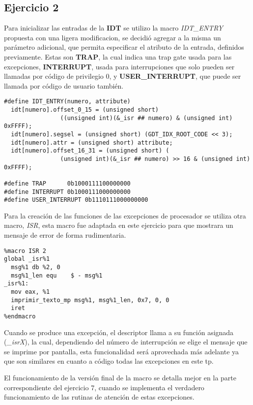 \subsection{Ejercicio 2}

Para inicializar las entradas de la {\bf IDT} se utilizo la macro {\it IDT_ENTRY\/}
propuesta con una ligera modificacion, se decidió agregar a la misma un
parámetro adicional, que permita especificar el atributo de la entrada,
definidos previamente.
Estas son {\bf TRAP}, la cual indica una trap gate usada para
las excepciones, {\bf INTERRUPT}, usada para interrupciones que solo pueden ser
llamadas por código de privilegio 0, y {\bf USER_INTERRUPT}, que puede ser llamada
por código de usuario también.

\begin{lstlisting}
#define IDT_ENTRY(numero, attribute)
  idt[numero].offset_0_15 = (unsigned short)
                ((unsigned int)(&_isr ## numero) & (unsigned int) 0xFFFF);
  idt[numero].segsel = (unsigned short) (GDT_IDX_ROOT_CODE << 3);
  idt[numero].attr = (unsigned short) attribute;
  idt[numero].offset_16_31 = (unsigned short) (
                (unsigned int)(&_isr ## numero) >> 16 & (unsigned int) 0xFFFF);

#define TRAP      0b1000111100000000
#define INTERRUPT 0b1000111000000000
#define USER_INTERRUPT 0b1110111000000000
\end{lstlisting}

Para la creación de las funciones de las excepciones de procesador se utiliza
otra macro, {\it ISR\/}, esta macro fue adaptada en este ejercicio para que
mostrara un mensaje de error de forma rudimentaria.

\begin{lstlisting}
%macro ISR 2
global _isr%1
  msg%1 db %2, 0
  msg%1_len equ    $ - msg%1
_isr%1:
  mov eax, %1
  imprimir_texto_mp msg%1, msg%1_len, 0x7, 0, 0
  iret
%endmacro
\end{lstlisting}

Cuando se produce una excepción, el descriptor llama a su función asignada
({\it _isrX\/}), la cual, dependiendo del número de interrupción se elige el
mensaje que se imprime por pantalla, esta funcionalidad será aprovechada más
adelante ya que son similares en cuanto a código todas las excepciones en este
tp.

El funcionamiento de la versión final de la macro se detalla mejor en la parte
correspondiente del ejercicio 7, cuando se implementa el verdadero
funcionamiento de las rutinas de atención
de estas excepciones.

